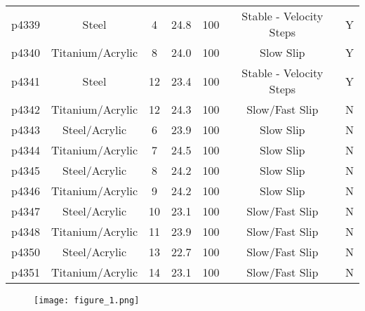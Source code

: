 \documentclass[11pt]{article}
\begin{document}
\begin{center}
\begin{sidewaystable}
\begin{tabular}{ | c c c c c c c | }
p4339      & Steel            & 4                   & 24.8            & 100                   & Stable - Velocity Steps         & Y              \\
p4340	     & Titanium/Acrylic & 8                   & 24.0            & 100                   & Slow Slip                       & Y              \\
p4341	     & Steel            & 12                  & 23.4            & 100                   & Stable - Velocity Steps         & Y              \\
p4342	     & Titanium/Acrylic & 12                  & 24.3            & 100                   & Slow/Fast Slip                  & N              \\
p4343	     & Steel/Acrylic    & 6                   & 23.9            & 100                   & Slow Slip                       & N              \\
p4344	     & Titanium/Acrylic & 7                   & 24.5            & 100                   & Slow Slip                       & N              \\
p4345	     & Steel/Acrylic    & 8                   & 24.2            & 100                   & Slow Slip                       & N              \\
p4346	     & Titanium/Acrylic & 9                   & 24.2            & 100                   & Slow Slip                       & N              \\
p4347	     & Steel/Acrylic    & 10                  & 23.1            & 100                   & Slow/Fast Slip                  & N              \\
p4348	     & Titanium/Acrylic & 11                  & 23.9            & 100                   & Slow/Fast Slip                  & N              \\
p4350	     & Steel/Acrylic    & 13                  & 22.7            & 100                   & Slow/Fast Slip                  & N              \\
p4351	     & Titanium/Acrylic & 14                  & 23.1            & 100                   & Slow/Fast Slip                  & N              \\


    \hline
    \end{tabular}
\end{sidewaystable}
\end{center}

\begin{figure}
    \centering
        \texttt{[image: figure\_1.png]}
       \caption{}
      \label{fig1}
\end{figure}
\end{document}
